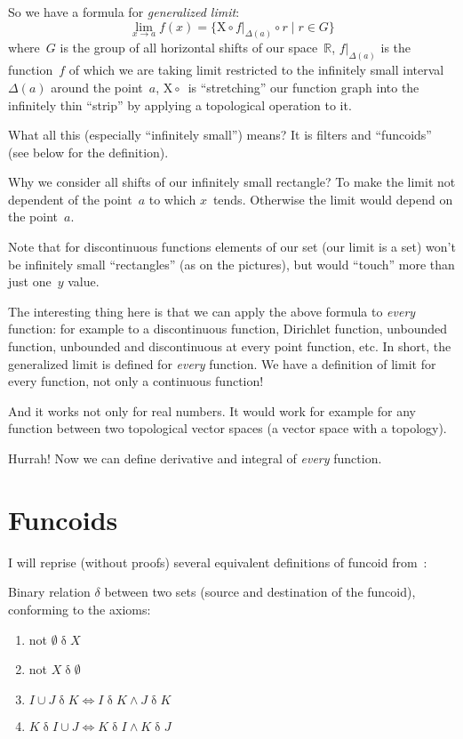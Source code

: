 So we have a formula for \emph{generalized limit}:
\[ \lim_{x\to a} f(x) =
\{ \mathrm{X} \circ f|_{\Delta(a)} \circ r \mid r\in G \} \]
where~$G$ is the group of all horizontal shifts of our space~$\mathbb{R}$, $f|_{\Delta(a)}$ is the function~$f$ of which we are taking limit restricted to the infinitely small interval~$\Delta(a)$ around the point~$a$, $\mathrm{X}\circ{}$~is ``stretching'' our function graph into the infinitely thin ``strip'' by applying a topological operation to it.

What all this (especially ``infinitely small'') means? It is filters and ``funcoids'' (see below for the definition).

Why we consider all shifts of our infinitely small rectangle? To make the limit not dependent of the point~$a$ to which $x$~tends. Otherwise the limit would depend on the point~$a$.

Note that for discontinuous functions elements of our set (our limit is a set) won't be infinitely small ``rectangles'' (as on the pictures), but would ``touch'' more than just one~$y$ value.

The interesting thing here is that we can apply the above formula to \emph{every} function: for example to a discontinuous function, Dirichlet function, unbounded function, unbounded and discontinuous at every point function, etc. In short, the generalized limit is defined for \emph{every} function. We have a definition of limit for every function, not only a continuous function!

And it works not only for real numbers. It would work for example for any function between two topological vector spaces (a vector space with a topology).

Hurrah! Now we can define derivative and integral of \emph{every} function.

\chapter{Funcoids}

I will reprise (without proofs) several equivalent definitions of funcoid from~\cite{volume-1-edition1}:

Binary relation $\delta$ between two sets (source and destination of the funcoid), conforming to the axioms:

\begin{enumerate}
\item not $\emptyset\mathrel{\delta}X$
\item not $X\mathrel{\delta}\emptyset$
\item $I\cup J \mathrel{\delta} K\iff I \mathrel{\delta}K\wedge J\mathrel{\delta}K$
\item $K\mathrel{\delta}I\cup J\iff K \mathrel{\delta}I\wedge K\mathrel{\delta}J$
\end{enumerate}

